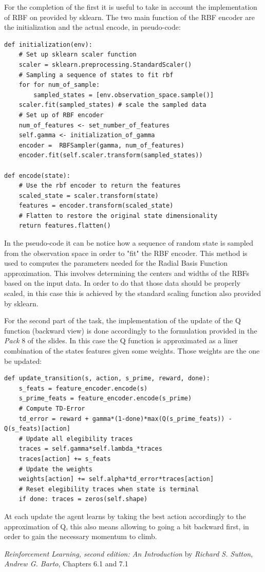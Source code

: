 \documentclass[10pt,a4paper]{article}
\begin{document}
\noindent For the completion of the first it is useful to take in account the implementation of RBF on provided by sklearn. The two main function of the RBF encoder are the initialization and the actual encode, in  pseudo-code:
\begin{lstlisting}
def initialization(env):
    # Set up sklearn scaler function
    scaler = sklearn.preprocessing.StandardScaler()
    # Sampling a sequence of states to fit rbf
    for for num_of_sample:
        sampled_states = [env.observation_space.sample()]
    scaler.fit(sampled_states) # scale the sampled data
    # Set up of RBF encoder
    num_of_features <- set_number_of_features
    self.gamma <- initialization_of_gamma
    encoder =  RBFSampler(gamma, num_of_features)
    encoder.fit(self.scaler.transform(sampled_states))

def encode(state):
    # Use the rbf encoder to return the features
    scaled_state = scaler.transform(state)
    features = encoder.transform(scaled_state)
    # Flatten to restore the original state dimensionality
    return features.flatten() 
\end{lstlisting}

\noindent In the pseudo-code it can be notice how a sequence of random state is sampled from the observation space in order to "fit" the RBF encoder. This method is used to computes the parameters needed for the Radial Basis Function approximation. This involves determining the centers and widths of the RBFs based on the input data. In order to do that those data should be properly scaled, in this case this is achieved by the standard scaling function also provided by sklearn.

\newpage
\noindent For the second part of the task, the implementation of the update of the Q function (backward view) is done accordingly to the formulation provided in the \textit{Pack} 8 of the slides. In this case the Q function is approximated as a liner combination of the states features given some weights. Those weights are the one be updated: 
\begin{lstlisting}
def update_transition(s, action, s_prime, reward, done):
    s_feats = feature_encoder.encode(s)
    s_prime_feats = feature_encoder.encode(s_prime)
    # Compute TD-Error
    td_error = reward + gamma*(1-done)*max(Q(s_prime_feats)) - Q(s_feats)[action]
    # Update all elegibility traces
    traces = self.gamma*self.lambda_*traces
    traces[action] += s_feats
    # Update the weights
    weights[action] += self.alpha*td_error*traces[action]
    # Reset elegibility traces when state is terminal
    if done: traces = zeros(self.shape)
\end{lstlisting}
At each update the agent learns by taking the best action accordingly to the approximation of Q, this also means allowing to going a bit backward first, in order to gain the necessary momentum to climb.
\newpage

\begin{thebibliography}{9}
    \emph{Reinforcement Learning, second edition: An Introduction} by \textit{Richard S. Sutton}, \textit{Andrew G. Barto}, Chapters 6.1 and 7.1 

\end{thebibliography}
\end{document}
